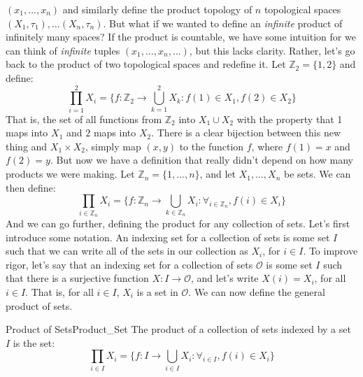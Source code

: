     $(x_{1},\dots,x_{n})$ and similarly define the product
    topology of $n$ topological spaces
    $(X_{1},\tau_{1}),\dots(X_{n},\tau_{n})$.
    But what if we wanted to define an \textit{infinite} product
    of infinitely many spaces? If the product is countable, we
    have some intuition for we can think of \textit{infinite} tuples
    $(x_{1},\dots,x_{n},\dots)$, but this lacks clarity.
    Rather, let's go back to the product of two topological
    spaces and redefine it. Let $\mathbb{Z}_{2}=\{1,2\}$
    and define:
    \begin{equation}
        \prod_{i=1}^{2}X_{i}=\{f:\mathbb{Z}_{2}\rightarrow
            \bigcup_{k=1}^{2}X_{k}:
            f(1)\in{X}_{1},f(2)\in{X}_{2}\}
    \end{equation}
    That is, the set of all functions from $\mathbb{Z}_{2}$ into
    $X_{1}\cup{X}_{2}$ with the property that 1 maps into $X_{1}$
    and $2$ maps into $X_{2}$. There is a clear bijection between
    this new thing and $X_{1}\times{X}_{2}$, simply map
    $(x,y)$ to the function $f$, where $f(1)=x$ and $f(2)=y$.
    But now we have a definition that really didn't depend
    on how many products we were making. Let
    $\mathbb{Z}_{n}=\{1,\dots,n\}$, and let $X_{1},\dots,X_{n}$
    be sets. We can then define:
    \begin{equation}
        \prod_{i\in\mathbb{Z}_{n}}X_{i}=
            \{f:\mathbb{Z}_{n}\rightarrow
                \bigcup_{k\in\mathbb{Z}_{n}}X_{i}:
                \forall_{i\in\mathbb{Z}_{n}},f(i)\in{X}_{i}\}
    \end{equation}
    And we can go further, defining the product for any collection
    of sets. Let's first introduce some notation. An indexing set
    for a collection of sets is some set $I$ such that we can
    write all of the sets in our collection as $X_{i}$, for
    $i\in{I}$. To improve rigor, let's say that an indexing set
    for a collection of sets $\mathcal{O}$ is some set $I$ such
    that there is a surjective function $X:I\rightarrow\mathcal{O}$,
    and let's write $X(i)=X_{i}$, for all $i\in{I}$. That is,
    for all $i\in{I}$, $X_{i}$ is a set in $\mathcal{O}$.
    We can now define the general product of sets.
    \begin{ldefinition}{Product of Sets}{Product_Set}
        The product of a collection of sets indexed by a set $I$
        is the set:
        \begin{equation}
            \prod_{i\in{I}}X_{i}=
            \{f:I\rightarrow\bigcup_{i\in{I}}X_{i}:
                \forall_{i\in{I}},f(i)\in{X}_{i}\}
        \end{equation}
    \end{ldefinition}
